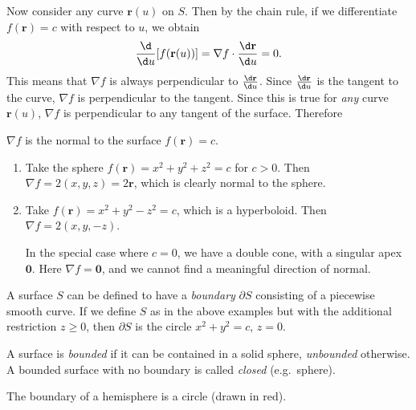 \documentclass[a4paper]{article}
\begin{document}
Now consider any curve $\mathbf{r}(u)$ on $S$. Then by the chain rule, if we differentiate $f(\mathbf{r}) = c$ with respect to $u$, we obtain
\[
  \frac{\d }{\d u}[f(\mathbf{r}(u))] = \nabla f\cdot \frac{\d \mathbf{r}}{\d u} = 0.
\]
This means that $\nabla f$ is always perpendicular to $\frac{\d \mathbf{r}}{\d u}$. Since $\frac{\d \mathbf{r}}{\d u}$ is the tangent to the curve, $\nabla f$ is perpendicular to the tangent. Since this is true for \emph{any} curve $\mathbf{r}(u)$, $\nabla f$ is perpendicular to any tangent of the surface. Therefore
\begin{prop}
  $\nabla f$ is the normal to the surface $f(\mathbf{r}) = c$.
\end{prop}

\begin{eg}\leavevmode
  \begin{enumerate}
    \item Take the sphere $f(\mathbf{r}) = x^2 + y^2 + z^2 = c$ for $c > 0$. Then $\nabla f = 2(x, y, z) = 2\mathbf{r}$, which is clearly normal to the sphere.
    \item Take $f(\mathbf{r}) = x^2 + y^2 - z^2 = c$, which is a hyperboloid. Then $\nabla f = 2(x, y, -z)$.

      In the special case where $c = 0$, we have a double cone, with a singular apex $\mathbf{0}$. Here $\nabla f = \mathbf{0}$, and we cannot find a meaningful direction of normal.
  \end{enumerate}
\end{eg}

\begin{defi}[Boundary]
  A surface $S$ can be defined to have a \emph{boundary} $\partial S$ consisting of a piecewise smooth curve. If we define $S$ as in the above examples but with the additional restriction $z \geq 0$, then $\partial S$ is the circle $x^2 + y^2 = c$, $z = 0$.

  A surface is \emph{bounded} if it can be contained in a solid sphere, \emph{unbounded} otherwise. A bounded surface with no boundary is called \emph{closed} (e.g.\ sphere).
\end{defi}
\begin{eg}\leavevmode
  \begin{center}
  \end{center}
  The boundary of a hemisphere is a circle (drawn in red).
\end{eg}
\end{document}
